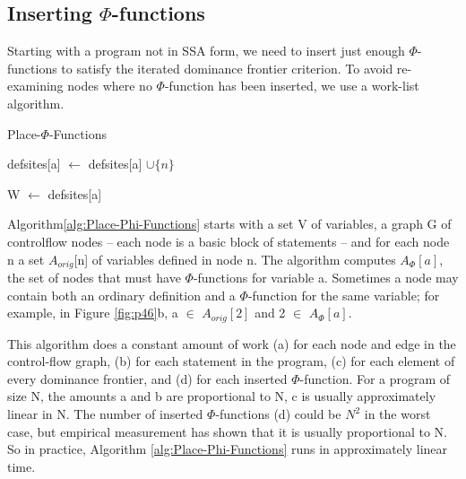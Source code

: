 \subsection{Inserting $\Phi$-functions}

Starting with a program not in SSA form, we need to insert just enough $\Phi$-functions to satisfy the iterated dominance frontier criterion. To avoid re-examining nodes where no $\Phi$-function has been inserted, we use a work-list algorithm.

\begin{algorithm}[H]
	\caption{Place-$\Phi$-Functions}\label{alg:Place-Phi-Functions}
	\begin{algorithmic}
		\State defsites[a] $\gets$ defsites[a] $\cup \{n\}$
		\EndFor
		\EndFor


		\State W $\gets$ defsites[a]
		\EndIf

		\EndIf
		\EndFor
		\EndWhile
		\EndFor

	\end{algorithmic}
\end{algorithm}


Algorithm\ref{alg:Place-Phi-Functions} starts with a set V of variables, a graph G of controlflow nodes – each node is a basic block of statements – and for each node n a set $A_{orig}$[n] of variables defined in node n. The algorithm
computes $A_{\Phi}[a]$, the set of nodes that must have $\Phi$-functions for variable
a. Sometimes a node may contain both an ordinary definition and a
$\Phi$-function for the same variable; for example, in Figure \ref{fig:p46}b, a $\in$ $A_{orig}[2]$
and 2 $\in$ $A_{\Phi}[a]$.


This algorithm does a constant amount of work (a) for each node and edge in the control-flow graph, (b) for each statement in the program, (c) for each element of every dominance frontier, and (d) for each inserted $\Phi$-function. For a program of size N, the amounts a and b are proportional to N, c is usually approximately linear in N. The number of inserted $\Phi$-functions (d) could be $N^2$ in the worst case, but empirical measurement has shown that it is usually proportional to N. So in practice, Algorithm \ref{alg:Place-Phi-Functions} runs in approximately linear time.


